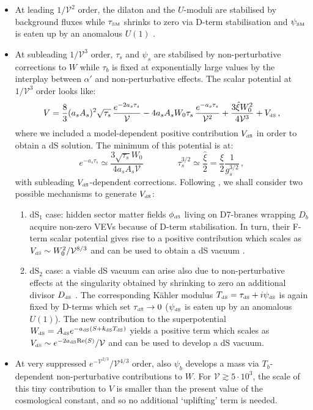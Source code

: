 \documentclass[11pt,a4paper]{article}
\newcommand{\bi}{\begin{itemize}}
\newcommand{\ei}{\end{itemize}}
\newcommand{\ben}{\begin{enumerate}}
\newcommand{\een}{\end{enumerate}}
\newcommand{\be}{\begin{equation}}
\newcommand{\ee}{\end{equation}}
\def\SM{{\scriptscriptstyle \rm SM}}
\def\dS{{\scriptscriptstyle \rm dS}}
\newcommand\vo{{\mathcal{V}}}
\begin{document}
\bi
\item At leading $1/\vo^2$ order, the dilaton and the $U$-moduli are stabilised by background fluxes while $\tau_\SM$ shrinks to zero via D-term stabilisation and $\psi_\SM$ is eaten up by an anomalous $U(1)$ \cite{Conlon:2008wa, CYembedding}.

\item At subleading $1/\vo^3$ order, $\tau_s$ and $\psi_s$ are stabilised by non-perturbative corrections to $W$ while $\tau_b$ is fixed at exponentially large values by the interplay between $\alpha'$ and non-perturbative effects. The scalar potential at $1/\vo^3$ order looks like:
\be
V = \frac{8}{3}(a_s A_s)^2 \sqrt{\tau_s} \,\frac{e^{- 2 a_s \tau_s}}{\vo}- 4 a_s A_s W_0 \tau_s \,\frac{e^{-a_s \tau_s}}{\vo^2 } + \frac{3\hat\xi W_0^2}{4\vo^3} + V_\dS\,,
\label{v0}
\ee
where we included a model-dependent positive contribution $V_\dS$ in order to obtain a dS solution. The minimum of this potential is at:
\be
e^{-a_s \tau_s} \simeq \frac{3 \sqrt{\tau_s} W_0}{4 a_s A_s \vo} \qquad\qquad \tau_s^{3/2} \simeq \frac{\hat{\xi}}{2}= \frac{\xi}{2}\frac{1}{g_s^{3/2}}\,,
\label{lvsmin}
\ee
with subleading $V_\dS$-dependent corrections. Following \cite{SoftTermsSeqLVS}, we shall consider two possible mechanisms to generate $V_\dS$:
\ben
\item dS$_1$ case: hidden sector matter fields $\phi_\dS$ living on D7-branes wrapping $D_b$ acquire non-zero VEVs because of D-term stabilisation. In turn, their F-term scalar potential gives rise to a positive contribution which scales as $V_\dS \sim W_0^2/\vo^{8/3}$ and can be used to obtain a dS vacuum \cite{CYembedding}. 
\item dS$_2$ case: a viable dS vacuum can arise also due to non-perturbative effects at the singularity obtained by shrinking to zero an additional divisor $D_\dS$ \cite{Cicoli:2012fh}. The corresponding K\"ahler modulus $T_\dS = \tau_\dS + i \psi_\dS$ is again fixed by D-terms which set $\tau_\dS\to 0$ ($\psi_\dS$ is eaten up by an anomalous $U(1)$). The new contribution to the superpotential $W_\dS = A_\dS e^{-a_\dS (S + k_\dS T_\dS)}$ yields a positive term which scales as $V_\dS \sim e^{-2 a_\dS {\rm Re}(S)}/\vo$ and can be used to develop a dS vacuum.
\een

\item At very suppressed $e^{-\vo^{2/3}}/\vo^{4/3}$ order, also $\psi_b$ develops a mass via $T_b$-dependent non-perturbative contributions to $W$. For $\vo\gtrsim 5\cdot 10^3$, the scale of this tiny contribution to $V$ is smaller than the present value of the cosmological constant, and so no additional `uplifting' term is needed.
\ei
\end{document}
